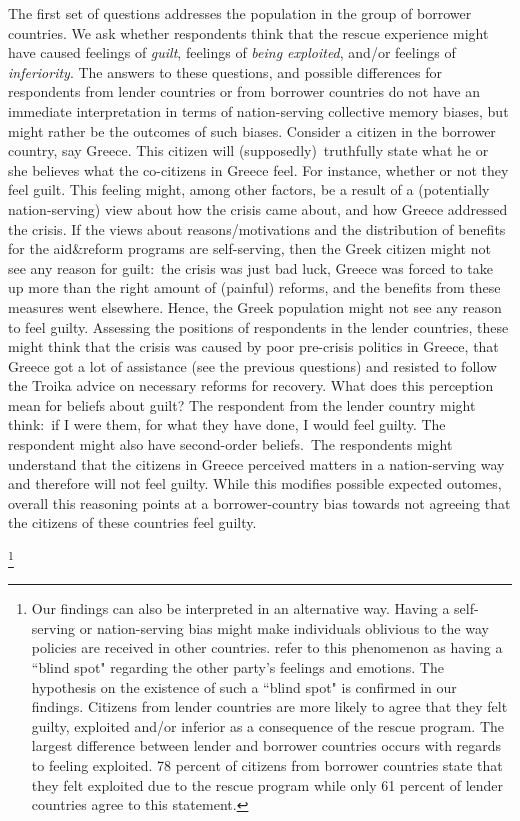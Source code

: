 The first set of questions addresses the population in the group of borrower
countries. We ask whether respondents think that the rescue experience might
have caused feelings of \textit{guilt}, feelings of \textit{being
exploited}, and/or feelings of \textit{inferiority}. The answers to these
questions, and possible differences for respondents from lender countries or
from borrower countries do not have an immediate interpretation in terms of
nation-serving collective memory biases, but might rather be the outcomes of
such biases. Consider a citizen in the borrower country, say Greece. This
citizen will (supposedly)\ truthfully state what he or she believes what the
co-citizens in Greece feel. For instance, whether or not they feel guilt.
This feeling might, among other factors, be a result of a (potentially
nation-serving) view about how the crisis came about, and how Greece
addressed the crisis. If the views about reasons/motivations and the
distribution of benefits for the aid\&reform programs are self-serving, then
the Greek citizen might not see any reason for guilt:\ the crisis was just
bad luck, Greece was forced to take up more than the right amount of
(painful) reforms, and the benefits from these measures went elsewhere.
Hence, the Greek population might not see any reason to feel guilty.
Assessing the positions of respondents in the lender countries, these might
think that the crisis was caused by poor pre-crisis politics in Greece, that
Greece got a lot of assistance (see the previous questions) and resisted to
follow the Troika advice on necessary reforms for recovery. What does this
perception mean for beliefs about guilt? The respondent from the lender
country might think:\ if I were them, for what they have done, I would feel
guilty. The respondent might also have second-order beliefs.\ The respondents
might understand that the citizens in Greece perceived matters in a
nation-serving way and therefore will not feel guilty. While this modifies
possible expected outomes, overall this reasoning points at a
borrower-country bias towards not agreeing that the citizens of these
countries feel guilty. 


\footnote{Our findings can also be interpreted in an alternative way.  Having a self-serving or nation-serving bias might make individuals oblivious to
the way policies are received in other countries. 
\cite{dezso} refer to this phenomenon as having a ``blind spot" regarding the other party's 
feelings and emotions. The hypothesis on the existence of such a ``blind spot" is confirmed in our findings.
Citizens from lender countries are more likely to agree that they felt guilty, exploited and/or inferior as a 
consequence of the rescue program. The largest difference between lender and borrower countries occurs with regards to feeling exploited.
78 percent  of citizens from borrower countries state that they felt exploited due to the rescue program while only 61 percent of lender countries
agree to this statement. 
}

